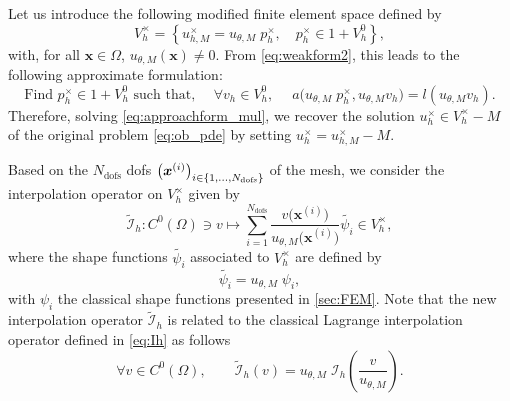 Let us introduce the following modified finite element space defined by
\begin{equation}
	\label{eq:Vh_mul}
	V_h^\times = \left\{
	u_{h,M}^\times = u_{\theta,M} \; p_h^\times,
	\quad p_h^\times \in 1+V_h^0
	\right\},
\end{equation}
with, for all $\bm{x}\in \Omega$, $u_{\theta,M}(\bm{x})\neq 0$.
From \eqref{eq:weakform2}, this leads to the following approximate formulation:
\begin{equation}\label{eq:approachform_mul}
	\text{Find } p_h^\times \in 1+ V_h^0 \text{ such that, }
	\quad
	\forall v_h \in V_h^0,
	\quad
	\; a \big(u_{\theta,M} \; p_h^\times,u_{\theta,M}  v_h \big) = l(u_{\theta,M} v_h).
\end{equation}
Therefore, solving \eqref{eq:approachform_mul}, we recover the solution $u_h^\times\in V_h^\times-M$ of the original problem \eqref{eq:ob_pde} by setting $u_h^\times = u_{h,M}^\times - M$.

Based on the $N_{\text{dofs}}$ dofs $\big(\bm{x}^{(i)}\big)_{i \in \{1,\ldots,N_{\text{\rm dofs}}\}}$ of the mesh, we consider the interpolation operator on $V_h^\times$ given by
\begin{equation*}
	\label{eq:Ih_tilde}
	\tilde{\mathcal{I}}_h:
	C^0(\Omega) \ni v \mapsto
	\sum_{i=1}^{N_\text{dofs}}\frac{v\big(\bm{x}^{(i)}\big)}{u_{\theta,M}\big(\bm{x}^{(i)}\big)} \tilde{\psi_i} \in V_h^\times,
\end{equation*}
where the shape functions $\tilde{\psi_i}$ associated to $V_h^\times$ are defined by
\[
	\tilde{\psi_i}={u_{\theta,M}} \; {\psi}_i,
\]
with ${\psi}_i$ the classical shape functions presented in \cref{sec:FEM}.
Note that the new interpolation operator $\tilde{\mathcal{I}}_h$ is related to the classical Lagrange interpolation operator defined in \eqref{eq:Ih} as follows
\begin{equation}
	\label{eq:relation_Ih_Ih_tilde}
	\forall v \in C^0(\Omega), \qquad
	\tilde{\mathcal{I}}_h(v)
	=
	u_{\theta,M} \;
	\mathcal{I}_h \left( \frac v {u_{\theta,M}} \right).
\end{equation}




